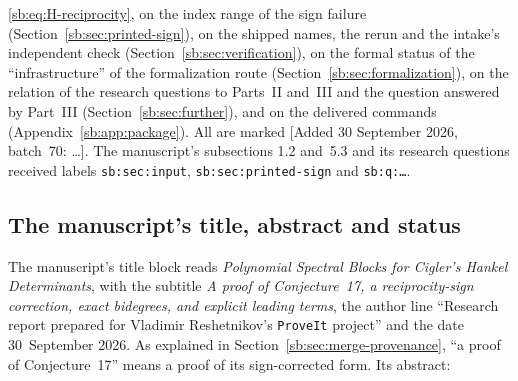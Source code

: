 \documentclass[11pt]{article}
\theoremstyle{definition}
\theoremstyle{remark}
\theoremstyle{definition}
\theoremstyle{plain}
\numberwithin{equation}{section}
\begin{document}
\begin{itemize}
\eqref{sb:eq:H-reciprocity}, on the index range of the sign failure
(Section~\ref{sb:sec:printed-sign}), on the shipped names, the rerun and the
intake's independent check (Section~\ref{sb:sec:verification}), on the
formal status of the ``infrastructure'' of the formalization route
(Section~\ref{sb:sec:formalization}), on the relation of the research
questions to Parts~II and~III and the question answered by Part~III
(Section~\ref{sb:sec:further}), and on the delivered commands
(Appendix~\ref{sb:app:package}). All are marked
\textup{[Added 30 September 2026, batch~70: \dots]}. The manuscript's
subsections 1.2 and~5.3 and its research questions received labels
\texttt{sb:sec:input}, \texttt{sb:sec:printed-sign} and \texttt{sb:q:\dots}.
\end{itemize}

\subsection{The manuscript's title, abstract and status}
\label{sb:sec:front}
The manuscript's title block reads \emph{Polynomial Spectral Blocks for
Cigler's Hankel Determinants}, with the subtitle \emph{A proof of
Conjecture~17, a reciprocity-sign correction, exact bidegrees, and explicit
leading terms}, the author line ``Research report prepared for Vladimir
Reshetnikov's \texttt{ProveIt} project'' and the date 30~September 2026. As
explained in Section~\ref{sb:sec:merge-provenance}, ``a proof of
Conjecture~17'' means a proof of its sign-corrected form. Its abstract:
\end{document}

